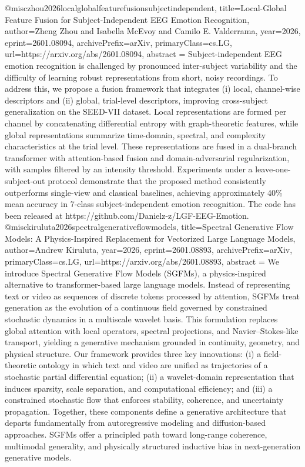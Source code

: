 {}@misc{zhou2026localglobalfeaturefusionsubjectindependent,
      title={Local-Global Feature Fusion for Subject-Independent EEG Emotion Recognition}, 
      author={Zheng Zhou and Isabella McEvoy and Camilo E. Valderrama},
      year={2026},
      eprint={2601.08094},
      archivePrefix={arXiv},
      primaryClass={cs.LG},
      url={https://arxiv.org/abs/2601.08094},
      abstract = {Subject-independent EEG emotion recognition is challenged by pronounced inter-subject variability and the difficulty of learning robust representations from short, noisy recordings. To address this, we propose a fusion framework that integrates (i) local, channel-wise descriptors and (ii) global, trial-level descriptors, improving cross-subject generalization on the SEED-VII dataset. Local representations are formed per channel by concatenating differential entropy with graph-theoretic features, while global representations summarize time-domain, spectral, and complexity characteristics at the trial level. These representations are fused in a dual-branch transformer with attention-based fusion and domain-adversarial regularization, with samples filtered by an intensity threshold. Experiments under a leave-one-subject-out protocol demonstrate that the proposed method consistently outperforms single-view and classical baselines, achieving approximately 40\% mean accuracy in 7-class subject-independent emotion recognition. The code has been released at https://github.com/Danielz-z/LGF-EEG-Emotion.}
}@misc{kiruluta2026spectralgenerativeflowmodels,
      title={Spectral Generative Flow Models: A Physics-Inspired Replacement for Vectorized Large Language Models}, 
      author={Andrew Kiruluta},
      year={2026},
      eprint={2601.08893},
      archivePrefix={arXiv},
      primaryClass={cs.LG},
      url={https://arxiv.org/abs/2601.08893},
      abstract = {We introduce Spectral Generative Flow Models (SGFMs), a physics-inspired alternative to transformer-based large language models. Instead of representing text or video as sequences of discrete tokens processed by attention, SGFMs treat generation as the evolution of a continuous field governed by constrained stochastic dynamics in a multiscale wavelet basis. This formulation replaces global attention with local operators, spectral projections, and Navier--Stokes-like transport, yielding a generative mechanism grounded in continuity, geometry, and physical structure.   Our framework provides three key innovations: (i) a field-theoretic ontology in which text and video are unified as trajectories of a stochastic partial differential equation; (ii) a wavelet-domain representation that induces sparsity, scale separation, and computational efficiency; and (iii) a constrained stochastic flow that enforces stability, coherence, and uncertainty propagation. Together, these components define a generative architecture that departs fundamentally from autoregressive modeling and diffusion-based approaches. SGFMs offer a principled path toward long-range coherence, multimodal generality, and physically structured inductive bias in next-generation generative models.}
}
